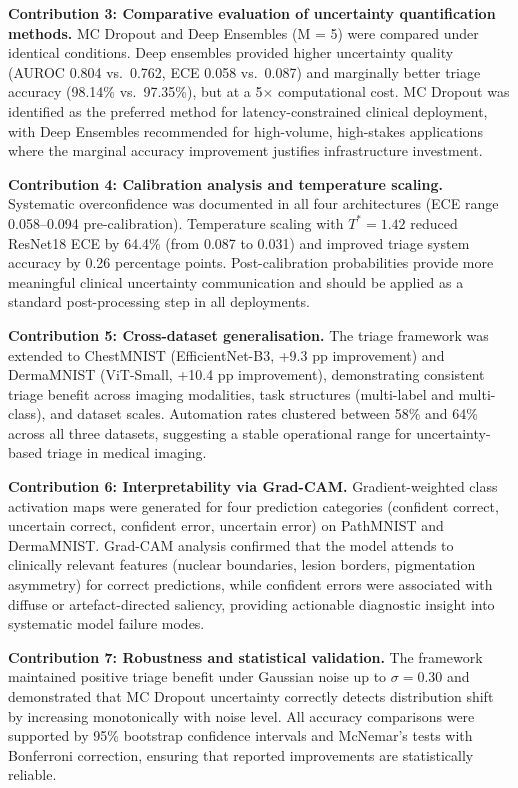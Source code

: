 \textbf{Contribution 3: Comparative evaluation of uncertainty quantification methods.} MC Dropout and Deep Ensembles (M = 5) were compared under identical conditions. Deep ensembles provided higher uncertainty quality (AUROC 0.804 vs.\ 0.762, ECE 0.058 vs.\ 0.087) and marginally better triage accuracy (98.14\% vs.\ 97.35\%), but at a 5$\times$ computational cost. MC Dropout was identified as the preferred method for latency-constrained clinical deployment, with Deep Ensembles recommended for high-volume, high-stakes applications where the marginal accuracy improvement justifies infrastructure investment.

\textbf{Contribution 4: Calibration analysis and temperature scaling.} Systematic overconfidence was documented in all four architectures (ECE range 0.058--0.094 pre-calibration). Temperature scaling with $T^* = 1.42$ reduced ResNet18 ECE by 64.4\% (from 0.087 to 0.031) and improved triage system accuracy by 0.26 percentage points. Post-calibration probabilities provide more meaningful clinical uncertainty communication and should be applied as a standard post-processing step in all deployments.

\textbf{Contribution 5: Cross-dataset generalisation.} The triage framework was extended to ChestMNIST (EfficientNet-B3, +9.3 pp improvement) and DermaMNIST (ViT-Small, +10.4 pp improvement), demonstrating consistent triage benefit across imaging modalities, task structures (multi-label and multi-class), and dataset scales. Automation rates clustered between 58\% and 64\% across all three datasets, suggesting a stable operational range for uncertainty-based triage in medical imaging.

\textbf{Contribution 6: Interpretability via Grad-CAM.} Gradient-weighted class activation maps were generated for four prediction categories (confident correct, uncertain correct, confident error, uncertain error) on PathMNIST and DermaMNIST. Grad-CAM analysis confirmed that the model attends to clinically relevant features (nuclear boundaries, lesion borders, pigmentation asymmetry) for correct predictions, while confident errors were associated with diffuse or artefact-directed saliency, providing actionable diagnostic insight into systematic model failure modes.

\textbf{Contribution 7: Robustness and statistical validation.} The framework maintained positive triage benefit under Gaussian noise up to $\sigma = 0.30$ and demonstrated that MC Dropout uncertainty correctly detects distribution shift by increasing monotonically with noise level. All accuracy comparisons were supported by 95\% bootstrap confidence intervals and McNemar's tests with Bonferroni correction, ensuring that reported improvements are statistically reliable.

